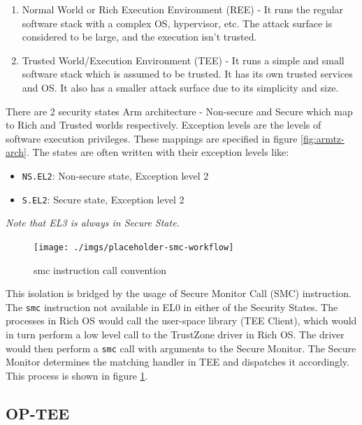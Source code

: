 \documentclass[a4paper, nobind]{templates/ociamthesis}
\providecommand{\tightlist}{%
  \setlength{\itemsep}{0pt}\setlength{\parskip}{0pt}}
\begin{document}
\begin{enumerate}
\def\labelenumi{\arabic{enumi}.}
\tightlist
\item
  Normal World or Rich Execution Environment (REE) - It runs the regular software
  stack with a complex OS, hypervisor, etc. The attack surface is considered to be large,
  and the execution isn't trusted.
\item
  Trusted World/Execution Environment (TEE) - It runs a simple and small software
  stack which is assumed to be trusted. It has its own trusted services and OS.
  It also has a smaller attack surface due to its simplicity and size.
\end{enumerate}

There are 2 security states Arm architecture - Non-secure and Secure which map
to Rich and Trusted worlds respectively.
Exception levels are the levels of software execution privileges.
These mappings are specified in figure \ref{fig:armtz-arch}.
The states are often written with their exception levels like:

\begin{itemize}
\tightlist
\item
  \texttt{NS.EL2}: Non-secure state, Exception level 2
\item
  \texttt{S.EL2}: Secure state, Exception level 2
\end{itemize}

\emph{Note that EL3 is always in Secure State.}

\begin{figure}[H]

{\centering \texttt{[image: ./imgs/placeholder-smc-workflow]} 

}

\caption{smc instruction call convention}\label{fig:smc-convention}
\end{figure}

This isolation is bridged by the usage of Secure Monitor Call (SMC) instruction.
The \texttt{smc} instruction not available in EL0 in either of the Security States.
The processes in Rich OS would call the user-space library (TEE Client),
which would in turn perform a low level call to the TrustZone driver in Rich OS.
The driver would then perform a \texttt{smc} call with arguments to the Secure Monitor.
The Secure Monitor determines the matching handler in TEE and dispatches it accordingly.
This process is shown in figure \ref{fig:smc-convention}.

\subsection{OP-TEE}\label{op-tee}
\end{document}
